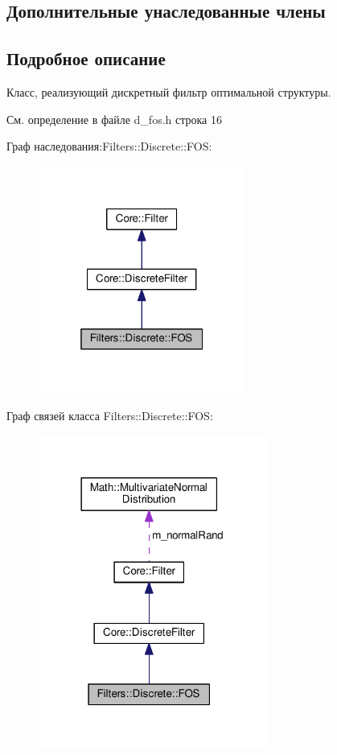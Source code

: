 \subsection*{Дополнительные унаследованные члены}


\subsection{Подробное описание}
Класс, реализующий дискретный фильтр оптимальной структуры. 

См. определение в файле d\+\_\+fos.\+h строка 16



Граф наследования\+:Filters\+:\+:Discrete\+:\+:F\+OS\+:
\nopagebreak
\begin{figure}[H]
\begin{center}
\leavevmode
\includegraphics[width=193pt]{class_filters_1_1_discrete_1_1_f_o_s__inherit__graph}
\end{center}
\end{figure}


Граф связей класса Filters\+:\+:Discrete\+:\+:F\+OS\+:
\nopagebreak
\begin{figure}[H]
\begin{center}
\leavevmode
\includegraphics[width=213pt]{class_filters_1_1_discrete_1_1_f_o_s__coll__graph}
\end{center}
\end{figure}


